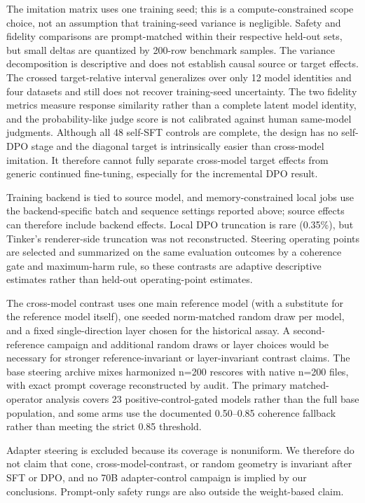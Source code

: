 \documentclass[letterpaper]{article}
\begin{document}
The imitation matrix uses one training seed; this is a compute-constrained scope choice,
not an assumption that training-seed variance is negligible. Safety and fidelity comparisons are
prompt-matched within their respective held-out sets,
but small deltas are quantized by 200-row benchmark samples. The variance decomposition
is descriptive and does not establish causal source or target effects. The crossed
target-relative interval generalizes over only 12 model identities and four datasets and
still does not recover training-seed uncertainty. The two fidelity
metrics measure response similarity rather than a complete latent model identity, and
the probability-like judge score is not calibrated against human same-model judgments.
Although all 48 self-SFT controls are complete, the design has no self-DPO stage and the
diagonal target is intrinsically easier than cross-model imitation. It therefore cannot
fully separate cross-model target effects from generic continued fine-tuning, especially
for the incremental DPO result.

Training backend is tied to source model, and memory-constrained local jobs use the
backend-specific batch and sequence settings reported above; source effects can therefore
include backend effects. Local DPO truncation is rare (0.35\%), but Tinker's renderer-side
truncation was not reconstructed. Steering operating points are selected and summarized on
the same evaluation outcomes by a coherence gate and maximum-harm rule, so these contrasts
are adaptive descriptive estimates rather than held-out operating-point estimates.

The cross-model contrast uses one main reference model (with a substitute for the
reference model itself), one seeded norm-matched random draw per model, and a fixed
single-direction layer chosen for the historical assay. A second-reference campaign
and additional random draws or layer choices would be necessary for stronger
reference-invariant or layer-invariant contrast claims. The base steering archive mixes harmonized n=200
rescores with native n=200 files, with exact prompt coverage reconstructed by audit. The primary matched-operator
analysis covers 23 positive-control-gated models rather than the full base population, and some arms use the
documented 0.50--0.85 coherence fallback rather than meeting the strict 0.85 threshold.

Adapter steering is excluded because its coverage is nonuniform. We therefore do not
claim that cone, cross-model-contrast, or random geometry is invariant after SFT or DPO, and no
70B adapter-control campaign is implied by our conclusions. Prompt-only safety rungs
are also outside the weight-based claim.
\end{document}

